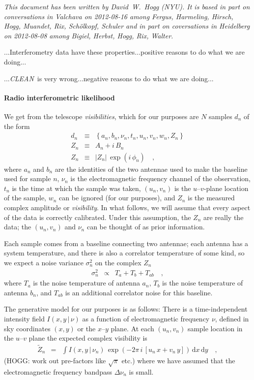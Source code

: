 \documentclass[12pt]{article}
\newcommand{\project}[1]{\textsl{#1}}
\newcommand{\CLEAN}{\project{CLEAN}}
\newcommand{\set}[1]{\left\{{#1}\right\}}
\newcommand{\given}{\,|\,}
\newcommand{\expectation}[1]{\tilde{#1}}
\newcommand{\dd}{\mathrm{d}}
\begin{document}
\textsl{This document has been written by David~W.~Hogg (NYU).  It is
  based in part on conversations in Valchava on 2012-08-16 among
  Fergus, Harmeling, Hirsch, Hogg, Muandet, Rix, Sch\"olkopf, Schuler
  and in part on coversations in Heidelberg on 2012-08-08 among
  Bigiel, Herbst, Hogg, Rix, Walter.}

...Interferometry data have these properties...positive reasons to do
what we are doing...

...\CLEAN\ is very wrong...negative reasons to do what we are doing...

\paragraph{Radio interferometric likelihood}

We get from the telescope \emph{visibilities}, which for our purposes
are $N$ samples $d_n$ of the form
\begin{eqnarray}
d_n &\equiv& \set{a_n, b_n, \nu_n, t_n, u_n, v_n, w_n, Z_n}
\\
Z_n &\equiv& A_n + i\,B_n
\\
Z_n &\equiv& \left|Z_n\right|\,\exp(i\,\phi_n)
\quad,
\end{eqnarray}
where $a_n$ and $b_n$ are the identities of the two antennae used to
make the baseline used for sample $n$, $\nu_n$ is the electromagnetic
frequency channel of the observation, $t_n$ is the time at which the
sample was taken, $(u_n, v_n)$ is the $u$--$v$-plane location of the
sample, $w_n$ can be ignored (for our purposes), and $Z_n$ is the
measured complex amplitude or \emph{visibility}.  In what follows, we
will assume that every aspect of the data is correctly calibrated.
Under this assumption, the $Z_n$ are really the data; the $(u_n,
v_n)$ and $\nu_n$ can be thought of as prior information.

Each sample comes from a baseline connecting two antennae; each
antenna has a system temperature, and there is also a correlator
temperature of some kind, so we expect a noise variance $\sigma_n^2$
on the complex $Z_n$
\begin{eqnarray}
\sigma_n^2 &\propto& T_a + T_b + T_{ab}
\quad ,
\end{eqnarray}
where $T_a$ is the noise temperature of antenna $a_n$, $T_b$ is the
noise temperature of antenna $b_n$, and $T_{ab}$ is an additional
correlator noise for this baseline.

The generative model for our purposes is as follows: There is a
time-independent intensity field $I(x,y\given\nu)$ as a function of
electromagnetic frequency $\nu$, defined in sky coordinates $(x,y)$ or
the $x$--$y$ plane.  At each $(u_n, v_n)$ sample location in the
$u$--$v$ plane the expected complex visibility is
\begin{eqnarray}
\expectation{Z}_n &=& \int I(x,y\given\nu_n)\,\exp(-2\pi\,i\,[u_n\,x + v_n\,y])\,\dd x\,\dd y
\quad ,
\end{eqnarray}
(HOGG: work out pre-factors like $\sqrt{\pi}$ etc.) where we have
assumed that the electromagnetic frequency bandpass $\Delta\nu_n$ is
small.
\end{document}
